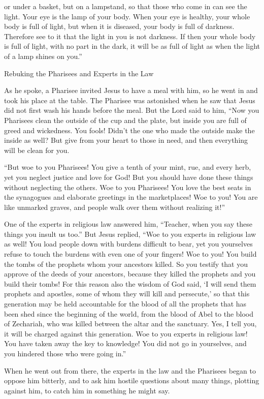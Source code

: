{or
under
a basket,
but
on
a lampstand,
so that
those who come in
can see
the light.
Your
eye
is the lamp
of your body.
When
your
eye
is
healthy,
your
whole
body
is
full of light,
but
when
it is
diseased,
your
body
is full of darkness.
Therefore
see
to it that the light
in
you
is
not
darkness.
If
then
your
whole
body
is full of light,
with no
part
in the dark,
it will be
as full of light
as
when
the light
of a lamp
shines
on you.”
\par }{\SH Rebuking the Pharisees and Experts in the Law
\par }{\PP {}As
he spoke,
a Pharisee
invited
Jesus
to have a meal
with
him,
so he went in
and
took
his place at the table.
The Pharisee
was astonished
when
he saw
that
Jesus did
not
first
wash
his hands
before
the meal.
But
the Lord
said
to
him,
“Now
you
Pharisees
clean
the outside
of the cup
and
the plate,
but
inside
you
are full
of greed
and
wickedness.
You fools! Didn’t
the one who made
the outside
make
the inside as well?
But
give
from
your heart
to those in need,
and
then
everything
will be
clean
for you.
\par }{\PP {}“But
woe
to you
Pharisees! You
give a tenth
of your mint,
rue,
and
every
herb,
yet
you neglect
justice
and
love
for God! But
you should
have done
these things
without
neglecting the others.
Woe
to you
Pharisees! You
love
the best seats
in
the synagogues
and
elaborate greetings
in
the marketplaces!
Woe
to you! You
are
like
unmarked
graves,
and
people
walk
over
them without
realizing it!”
\par }{\PP {}One of
the experts in religious law
answered
him,
“Teacher,
when
you say
these things
you insult
us
too.”
But
Jesus replied, “Woe
to you
experts in religious law
as well! You load people
down with burdens
difficult to bear,
yet
you yourselves refuse
to touch
the burdens
with even one
of your
fingers!
Woe
to you! You
build
the tombs
of the prophets
whom your
ancestors
killed.
So
you
testify
that you approve
of the deeds
of your
ancestors,
because
they
killed
the prophets
and
you
build their tombs!
For
this reason
also
the wisdom
of God
said,
‘I will send
them
prophets
and
apostles,
some of
whom
they will kill
and
persecute,’
so that
this
generation
may be held accountable
for the blood
of all
the prophets
that has been shed
since
the beginning
of the world,
from
the blood
of Abel
to
the blood
of Zechariah,
who was killed
between
the altar
and
the sanctuary.
Yes,
I tell
you,
it will be charged
against
this
generation.
Woe
to you
experts in religious law! You
have taken away
the key
to knowledge! You did
not
go in
yourselves,
and
you hindered
those who were going in.”
\par }{\PP {}When
he
went out
from there,
the experts in the law
and
the Pharisees
began
to oppose
him bitterly,
and
to ask
him
hostile questions
about
many things,
plotting against
him,
to catch
him in
something
he
might say.

}
